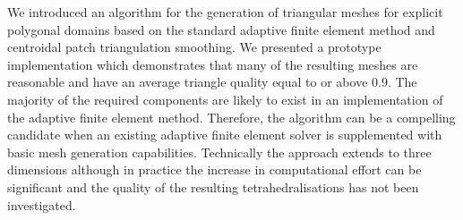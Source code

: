 \documentclass[12pt]{rmstyle}
\begin{document}
We introduced an algorithm for the generation of triangular meshes for explicit
polygonal domains based on the standard adaptive finite element method and
centroidal patch triangulation smoothing.  We presented a prototype
implementation which demonstrates that many of the resulting
meshes are reasonable and have an average triangle quality equal to or above
0.9.
The majority of the required components are likely to exist in an
implementation of the adaptive finite element method.  Therefore, the algorithm
can be a compelling candidate when an existing adaptive finite element solver is
supplemented with basic mesh generation capabilities.
Technically the approach extends to three dimensions although in practice the
increase in computational effort can be significant and the quality of the
resulting tetrahedralisations has not been investigated.



\end{document}
